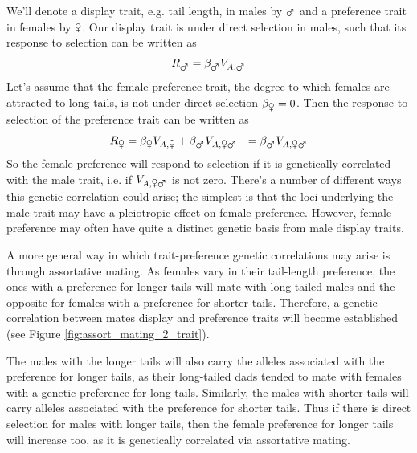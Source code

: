 We'll denote a display trait, e.g. tail length, in males by $\mars$ and a preference
trait in females by $\venus$. Our display trait is under direct selection in males, such that its response to selection can be written as
\begin{equation}
R_{\mars} = \beta_{\mars} V_{A, \mars}
\end{equation}
Let's assume that the female preference trait, the degree to which
females are attracted to long tails, is not under direct
selection $\beta_{\venus}=0$. Then the response to selection of the
preference trait can be written as
\begin{eqnarray}
R_{\venus} &=\beta_{\venus}V_{A,\venus}  + \beta_{\mars} V_{A, \venus
  \mars}
& = \beta_{\mars} V_{A, \venus  \mars}
\end{eqnarray}
So the female preference will respond to selection if it is
genetically correlated with the male trait, i.e. if $V_{A, \venus
  \mars}$ is not zero. There's a number of different ways this genetic correlation could arise; the
simplest is that the loci underlying the male trait may have a
pleiotropic effect on female preference. However, female preference
may often have quite a distinct genetic basis from male display traits.

A more general way in which trait-preference genetic correlations may arise is through assortative mating. As females vary in their
tail-length preference, the ones with a preference for longer
tails will mate with long-tailed males and the opposite for females
with a preference for shorter-tails. Therefore, a
genetic correlation between mates display and preference traits will
become established (see Figure \ref{fig:assort_mating_2_trait}). 

The males with the longer tails will also carry the alleles
associated with the preference for longer tails, as their long-tailed
dads tended to mate with females with a genetic preference for long
tails. Similarly, the males with shorter tails will carry alleles associated with the preference for
shorter tails. Thus if there is direct selection for males with longer tails, then
the female preference for longer tails will increase too, as it is
genetically correlated via assortative mating. 

